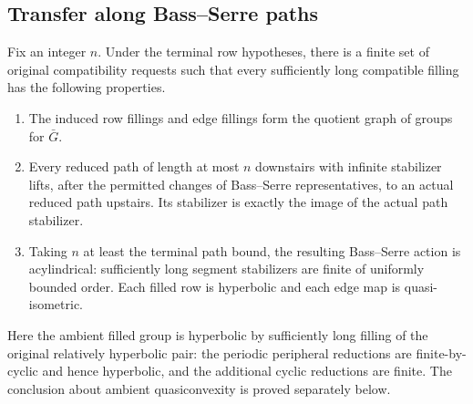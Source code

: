 \subsection{Transfer along Bass--Serre paths}

\begin{theorem}\label{transfer:finite-path-transfer}
Fix an integer \(n\). Under the terminal row hypotheses, there is a finite set of original compatibility requests such that every sufficiently long compatible filling has the following properties.
\begin{enumerate}[label=(\roman*)]
\item The induced row fillings and edge fillings form the quotient graph of groups for \(\bar G\).
\item Every reduced path of length at most \(n\) downstairs with infinite stabilizer lifts, after the permitted changes of Bass--Serre representatives, to an actual reduced path upstairs. Its stabilizer is exactly the image of the actual path stabilizer.
\item Taking \(n\) at least the terminal path bound, the resulting Bass--Serre action is acylindrical: sufficiently long segment stabilizers are finite of uniformly bounded order. Each filled row is hyperbolic and each edge map is quasi-isometric.
\end{enumerate}
Here the ambient filled group is hyperbolic by sufficiently long filling of the original relatively hyperbolic pair: the periodic peripheral reductions are finite-by-cyclic and hence hyperbolic, and the additional cyclic reductions are finite. The conclusion about ambient quasiconvexity is proved separately below.
\end{theorem}
